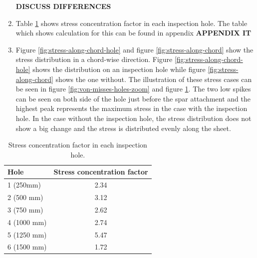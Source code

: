 \documentclass[11pt,a4paper,oneside]{memoir}
\begin{document}
\begin{enumerate}
\begin{figure}[!hbt]
\begin{minipage}{.5\textwidth}
    \label{fig:von-misses-w/o-holes-zoom}
    \end{minipage}
\end{figure}
    \textbf{DISCUSS DIFFERENCES}
    \item Table \ref{tab:stress-conc-factor} shows stress concentration factor in each inspection hole. The table which shows calculation for this can be found in appendix \textbf{APPENDIX IT}
    \item Figure \ref{fig:stress-along-chord-hole} and figure \ref{fig:stress-along-chord} show the stress distribution in a chord-wise direction. Figure \ref{fig:stress-along-chord-hole} shows the distribution on an inspection hole while figure \ref{fig:stress-along-chord} shows the one without. The illustration of these stress cases can be seen in figure \ref{fig:von-misses-holes-zoom} and figure \ref{fig:von-misses-w/o-holes-zoom}. The two low spikes can be seen on both side of the hole just before the spar attachment and the highest peak represents the maximum stress in the case with the inspection hole. In the case without the inspection hole, the stress distribution does not show a big change and the stress is distributed evenly along the sheet.
\end{enumerate}

\begin{table}[h]
    \centering
    \begin{tabular}{l c}
    \toprule
      Hole   &  Stress concentration factor\\
     \midrule
      1 (250mm)  & 2.34\\
      2 (500 mm) &   3.12\\
      3 (750 mm) &   2.62\\
      4 (1000 mm) &   2.74\\
      5 (1250 mm) &   5.47\\
      6 (1500 mm) &   1.72\\
      \bottomrule
    \end{tabular}
    \caption{Stress concentration factor in each inspection hole.}
    \label{tab:stress-conc-factor}
\end{table}
\end{document}
